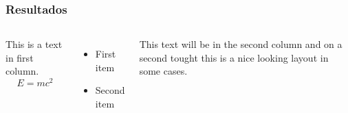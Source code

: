 \begin{frame}
\frametitle{Resultados}

\begin{columns}
	
	This is a text in first column.
	$$E=mc^2$$
	\begin{itemize}
		\item First item
		\item Second item
	\end{itemize}
	
	This text will be in the second column
	and on a second tought this is a nice looking
	layout in some cases.
\end{columns}
\end{frame}
